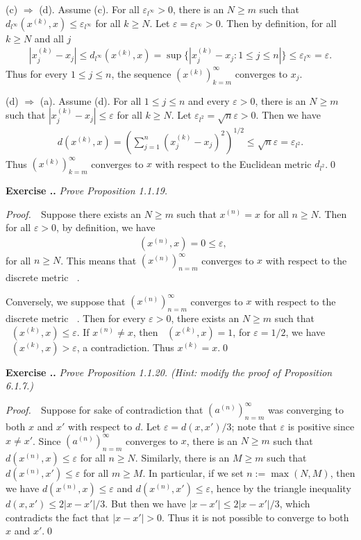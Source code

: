 \documentclass{book}
\DeclareMathOperator{\disc}{\mathit{d}_{\mathrm{disc}}}
\newcommand{\pff}{\vspace{.25em}\noindent\emph{Proof.}~~}
\newcounter{Exercise}[section]
\renewcommand{\theExercise}{\thesection.\arabic{Exercise}.}
\newcommand{\new}{\vspace{1.5em}\noindent\textbf{Exercise \stepcounter{Exercise}\textbf{\theExercise}} }
\begin{document}
(c) $\Rightarrow$ (d). Assume (c). For all $\varepsilon_{l^\infty}>0$, there is an $N\geq m$ such that $d_{l^\infty}(x^{(k)},x)\leq\varepsilon_{l^\infty}$ for all $k\geq N$. Let $\varepsilon=\varepsilon_{l^\infty}>0$. Then by definition, for all $k\geq N$ and all $j$
    \begin{align*}
        |x^{(k)}_j-x_j|\leq d_{l^\infty}(x^{(k)},x)=\sup\{|x^{(k)}_j-x_j:1\leq j\leq n|\}\leq\varepsilon_{l^\infty}=\varepsilon.
    \end{align*}
Thus for every $1\leq j\leq n$, the sequence $(x^{(k)})_{k=m}^{\infty}$ converges to $x_j$.

(d) $\Rightarrow$ (a). Assume (d). For all $1\leq j\leq n$ and every $\varepsilon>0$, there is an $N\geq m$ such that $|x^{(k)}_j-x_j|\leq\varepsilon$ for all $k\geq N$. Let $\varepsilon_{l^2}=\sqrt{n}\varepsilon>0$. Then we have
    \begin{align*}
        d(x^{(k)},x)=\left(\sum_{j=1}^n(x^{(k)}_j-x_j)^2\right)^{1/2}\leq\sqrt{n}\varepsilon=\varepsilon_{l^2}.
    \end{align*}
Thus $(x^{(k)})_{k=m}^{\infty}$ converges to $x$ with respect to the Euclidean metric $d_{l^2}$.\qed

\new\emph{Prove Proposition 1.1.19.}

\pff Suppose there exists an $N\geq m$ such that $x^{(n)}=x$ for all $n\geq N$. Then for all $\varepsilon>0$, by definition, we have
    \begin{align*}
        \disc(x^{(n)},x)=0\leq\varepsilon,
    \end{align*}
for all $n\geq N$. This means that $(x^{(n)})_{n=m}^{\infty}$ converges to $x$ with respect to the discrete metric $\disc$.

Conversely, we suppose that $(x^{(n)})_{n=m}^{\infty}$ converges to $x$ with respect to the discrete metric $\disc$. Then for every $\varepsilon>0$, there exists an $N\geq m$ such that $\disc(x^{(k)},x)\leq\varepsilon$. If $x^{(n)}\neq x$, then $\disc(x^{(k)},x)=1$, for $\varepsilon=1/2$, we have $\disc(x^{(k)},x)>\varepsilon$, a contradiction. Thus $x^{(k)}=x$.\qed

\new\emph{Prove Proposition 1.1.20. (Hint: modify the proof of Proposition 6.1.7.)}

\pff Suppose for sake of contradiction that $(a^{(n)})_{n=m}^{\infty}$ was converging to both $x$ and $x'$ with respect to $d$. Let $\varepsilon=d(x,x')/3$; note that $\varepsilon$ is positive since $x\neq x'$. Since $(a^{(n)})_{n=m}^{\infty}$ converges to $x$, there is an $N\geq m$ such that $d(x^{(n)},x)\leq\varepsilon$ for all $n\geq N$. Similarly, there is an $M\geq m$ such that $d(x^{(n)},x')\leq\varepsilon$ for all $m\geq M$. In particular, if we set $n:=\max(N,M)$, then we have $d(x^{(n)},x)\leq\varepsilon$ and $d(x^{(n)},x')\leq\varepsilon$, hence by the triangle inequality $d(x,x')\leq 2|x-x'|/3$. But then we have $|x-x'|\leq 2|x-x'|/3$, which contradicts the fact that $|x-x'|>0$. Thus it is not possible to converge to both $x$ and $x'$.\qed
\end{document}
